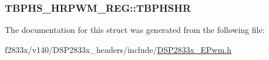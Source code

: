 \subsubsection[{T\+B\+P\+H\+S\+H\+R}]{ T\+B\+P\+H\+S\+\_\+\+H\+R\+P\+W\+M\+\_\+\+R\+E\+G\+::\+T\+B\+P\+H\+S\+H\+R}\label{struct_t_b_p_h_s___h_r_p_w_m___r_e_g_af476ff5e3f9fbffaad0fecfab7f28488}


The documentation for this struct was generated from the following file\+:\begin{DoxyCompactItemize}
\item 
f2833x/v140/\+D\+S\+P2833x\+\_\+headers/include/\hyperlink{_d_s_p2833x___e_pwm_8h}{D\+S\+P2833x\+\_\+\+E\+Pwm.\+h}\end{DoxyCompactItemize}
